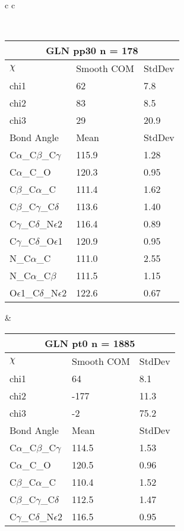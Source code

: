 \newpage

\begin{longtable}{ c c }

\caption{GLN Central Values}\\
  \begin{tabular}{ l l l }
  \toprule
  \multicolumn{3}{c}{GLN \textbf{pp30} n = 178} \\ \toprule
  $\chi$       & Smooth COM & StdDev \\ \midrule
  chi1 & 62 & 7.8 \\ 
  chi2 & 83 & 8.5 \\ 
  chi3 & 29 & 20.9 \\ \midrule
  Bond Angle   & Mean     & StdDev \\ \midrule
  C$\alpha$\_C$\beta$\_C$\gamma$ & 115.9 & 1.28\\
  C$\alpha$\_C\_O & 120.3 & 0.95\\
  C$\beta$\_C$\alpha$\_C & 111.4 & 1.62\\
  C$\beta$\_C$\gamma$\_C$\delta$ & 113.6 & 1.40\\
  C$\gamma$\_C$\delta$\_N$\epsilon$2 & 116.4 & 0.89\\
  C$\gamma$\_C$\delta$\_O$\epsilon$1 & 120.9 & 0.95\\
  N\_C$\alpha$\_C & 111.0 & 2.55\\
  N\_C$\alpha$\_C$\beta$ & 111.5 & 1.15\\
  O$\epsilon$1\_C$\delta$\_N$\epsilon$2 & 122.6 & 0.67\\
  \bottomrule
  \end{tabular}
  &
  \begin{tabular}{ l l l }
  \toprule
  \multicolumn{3}{c}{GLN \textbf{pt0} n = 1885} \\ \toprule
  $\chi$       & Smooth COM & StdDev \\ \midrule
  chi1 & 64 & 8.1 \\ 
  chi2 & -177 & 11.3 \\ 
  chi3 & -2 & 75.2 \\ \midrule
  Bond Angle   & Mean     & StdDev \\ \midrule
  C$\alpha$\_C$\beta$\_C$\gamma$ & 114.5 & 1.53\\
  C$\alpha$\_C\_O & 120.5 & 0.96\\
  C$\beta$\_C$\alpha$\_C & 110.4 & 1.52\\
  C$\beta$\_C$\gamma$\_C$\delta$ & 112.5 & 1.47\\
  C$\gamma$\_C$\delta$\_N$\epsilon$2 & 116.5 & 0.95\\

\end{tabular}
\end{longtable}
